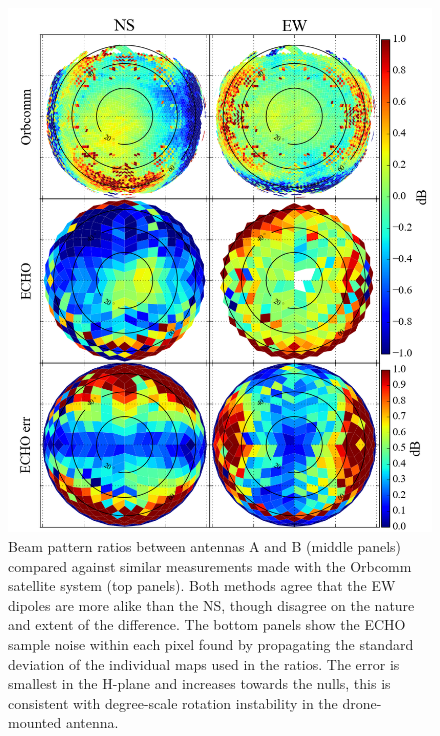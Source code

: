 \documentclass[preprint2,numberedappendix,tighten,twocolappendix]{aastex6}
\begin{document}
\begin{figure}
\begin{minipage}{0.45\textwidth}
\centering
\includegraphics[width=\textwidth]{figures/GB_OC_ratio_compare.png}
\caption{Beam pattern ratios between antennas A and B (middle panels) compared against similar measurements made with the Orbcomm satellite system (top panels).  Both methods agree that the EW dipoles are more alike than the NS, though disagree on the nature and extent of the difference.  The bottom panels show the ECHO sample noise within each pixel found by propagating the standard deviation of the individual maps used in the ratios. The error is smallest in the H-plane and increases towards the nulls, this is consistent with degree-scale rotation instability in the drone-mounted antenna.}\label{fig:GB_ratio_maps}
\end{minipage}
\centering
\begin{minipage}{0.45\textwidth}
\centering

\end{minipage}
\end{figure}
\end{document}
